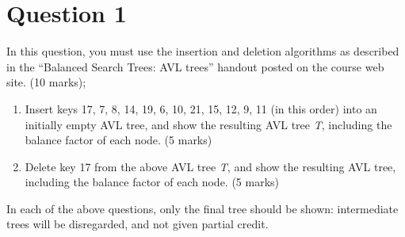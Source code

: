 \documentclass[11pt]{article}
\begin{document}
\section*{Question 1}
In this question, you must use the insertion and deletion algorithms as described
in the “Balanced Search Trees: AVL trees” handout posted on the course web site. (10 marks);

\begin{enumerate}[label=\alph*.]
\item Insert keys 17, 7, 8, 14, 19, 6, 10, 21, 15, 12, 9, 11 (in this order) into an initially empty
AVL tree, and show the resulting AVL tree \textit{T}, including the balance factor of each node. (5 marks)
\item Delete key 17 from the above AVL tree \textit{T}, and show the resulting AVL tree, including the
balance factor of each node. (5 marks)
\end{enumerate}

\noindent
In each of the above questions, only the final tree should be shown: intermediate trees will be disregarded,
and not given partial credit.
\end{document}
